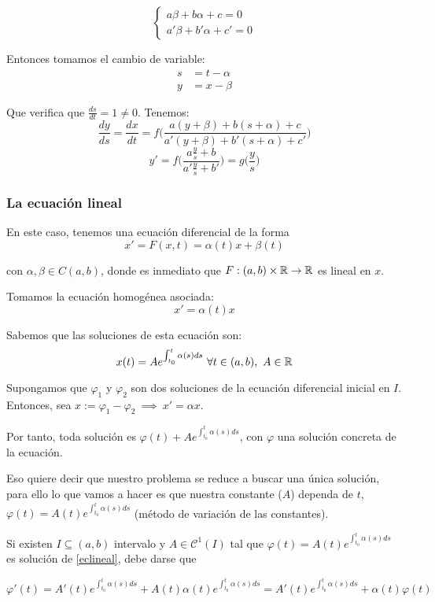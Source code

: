 \[
\begin{cases}
  a\beta + b\alpha + c = 0\\
  a'\beta + b'\alpha + c' = 0
\end{cases}
\]

Entonces tomamos el cambio de variable:
\begin{align*}
s &= t-\alpha \\
y &= x - \beta
\end{align*}

Que verifica que $\frac{ds}{dt} = 1 \ne 0$. Tenemos: 
\[
\frac{dy}{ds} = \frac{dx}{dt} = f\Big( \frac{a(y+\beta ) + b (s+\alpha ) + c}{a'(y+\beta ) + b'(s+ \alpha ) + c'} \Big)
\]
\[
y' = f \bigg( \frac{a \frac{y}{s} + b}{a'\frac{y}{s} + b'} \bigg) = g\Big( \frac{y}{s}\Big)
\]

\subsubsection{La ecuación lineal}

En este caso, tenemos una ecuación diferencial de la forma
\[x' = F(x,t) = \alpha (t)x + \beta ( t) \tag{E} \label{eclineal} \]

con $\alpha , \beta \in C(a,b)$, donde es inmediato que $F:(a,b)\times \mathbb{R} \to \mathbb{R}$ es lineal en $x$.

Tomamos la ecuación homogénea asociada:
\[
x' = \alpha (t) x
\]

Sabemos que las soluciones de esta ecuación son:
\[
x(t) = A e^{\int_{t_0}^{t} \alpha (s) ds}  \ \forall t \in (a,b), \ A \in \R
\]

Supongamos que $\varphi _1$ y $\varphi _2 $ son dos soluciones de la ecuación diferencial inicial en $I$. Entonces, sea $x := \varphi _1  - \varphi _2  \ \implies \ x' = \alpha x$.

Por tanto, toda solución es $\varphi (t) + A e^{\int_{t_0}^{t} \alpha (s) ds}$, con $\varphi$ una solución concreta de la ecuación.

Eso quiere decir que nuestro problema se reduce a buscar una única solución, para ello lo que vamos a hacer es que nuestra constante ($A$) dependa de $t$, $\varphi (t) = A(t) e^{\int_{t_0}^{t} \alpha (s) ds}$ (método de variación de las constantes).

Si existen $I \subseteq (a,b)$ intervalo y $A \in \mathscr{C}^1(I)$ tal que
$\varphi(t) = A(t) e^{\int_{t_0}^t \alpha(s)ds}$ es solución de \eqref{eclineal}, debe darse que

\[
 \varphi'(t) = A'(t)e^{\int_{t_0}^t \alpha(s) ds} + A(t)\alpha(t)e^{\int_{t_0}^t \alpha(s) ds} = A'(t)e^{\int_{t_0}^t \alpha(s) ds} + \alpha(t)\varphi(t)
 \]

